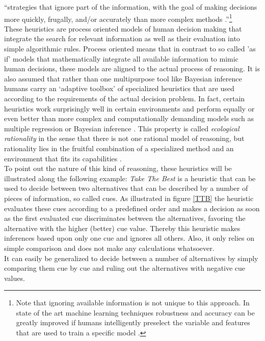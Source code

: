 ``strategies that ignore part of the information, with the goal of making decisions more quickly, frugally, and/or accurately than more complex methods \citep{Gigerenzer2011}.''\footnote{Note that ignoring available information is not unique to this approach. In state of the art machine learning techniques robustness and accuracy can be greatly improved if humans intelligently preselect the variable and features that are used to train a specific model \citep{Guyon2003}.} \\

These heuristics are process oriented models of human decision making that integrate the search for relevant information as well as their evaluation into simple algorithmic rules. Process oriented means that in contrast to so called 'as if' models that mathematically integrate all available information to mimic human decisions, these models are aligned to the actual process of reasoning. It is also assumed that rather than one multipurpose tool like Bayesian inference humans carry an `adaptive toolbox' of specialized heuristics \citep{gigerenzer2002bounded} that are used according to the requirements of the actual decision problem.
In fact, certain heuristics work surprisingly well in certain environments and perform equally or even better than more complex and computationally demanding models such as multiple regression or Bayesian inference \citep{Gigerenzer2009}. This property is called \emph{ecological rationality} in the sense that there is not one rational model of reasoning, but rationality lies in the fruitful combination of a specialized method and an environment that fits its capabilities \citep{todd2007environments}.\\
To point out the nature of this kind of reasoning, these heuristics will be illustrated along the following example: \emph{Take The Best} \citep{Gigerenzer1996} is a heuristic that can be used to decide between two alternatives that can be described by a number of pieces of information, so called cues. As illustrated in figure \ref{TTB} the heuristic evaluates these cues according to a predefined order and makes a decision as soon as the first evaluated cue discriminates between the alternatives, favoring the alternative with the higher (better) cue value. Thereby this heuristic makes inferences based upon only one cue and ignores all others. Also, it only relies on simple comparison and does not make any calculations whatsoever.\\
It can easily be generalized to decide between a number of alternatives by simply comparing them cue by cue and ruling out the alternatives with negative cue values.
